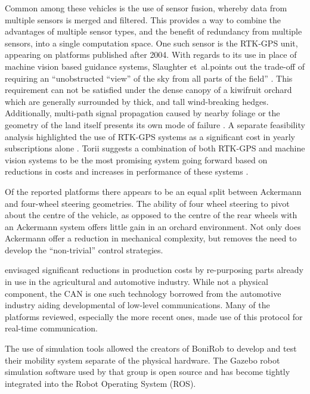 \documentclass[preprint,authoryear,12pt]{elsarticle}
\begin{document}
    Common among these vehicles is the use of sensor fusion, whereby data from multiple sensors is merged and filtered.
    This provides a way to combine the advantages of multiple sensor types, and the benefit of redundancy from multiple sensors, into a single computation space.
    One such sensor is the RTK-GPS unit, appearing on platforms published after 2004.
    With regards to its use in place of machine vision based guidance systems, Slaughter et~al.\@ points out the trade-off of requiring an ``unobstructed ``view'' of the sky from all parts of the field'' \citep{Slaughter2008}.
    This requirement can not be satisfied under the dense canopy of a kiwifruit orchard which are generally surrounded by thick, and tall wind-breaking hedges.
    Additionally, multi-path signal propagation caused by nearby foliage or the geometry of the land itself presents its own mode of failure \citep{Durrant-Whyte2005}.
    A separate feasibility analysis highlighted the use of RTK-GPS systems as a significant cost in yearly subscriptions alone \citep{Pedersen2006}.
    Torii suggests a combination of both RTK-GPS and machine vision systems to be the most promising system going forward based on reductions in costs and increases in performance of these systems \cite{Torii2000}.

    Of the reported platforms there appears to be an equal split between Ackermann and four-wheel steering geometries.
    The ability of four wheel steering to pivot about the centre of the vehicle, as opposed to the centre of the rear wheels with an Ackermann system offers little gain in an orchard environment.
    Not only does Ackermann offer a reduction in mechanical complexity, but removes the need to develop the ``non-trivial'' control strategies.

    \cite{Blackmore2007} envisaged significant reductions in production costs by re-purposing parts already in use in the agricultural and automotive industry.
    While not a physical component, the CAN is one such technology borrowed from the automotive industry aiding developmental of low-level communications.
    Many of the platforms reviewed, especially the more recent ones, made use of this protocol for real-time communication.

    The use of simulation tools allowed the creators of BoniRob to develop and test their mobility system separate of the physical hardware.
    The Gazebo robot simulation software used by that group is open source and has become tightly integrated into the Robot Operating System (ROS).
\end{document}
